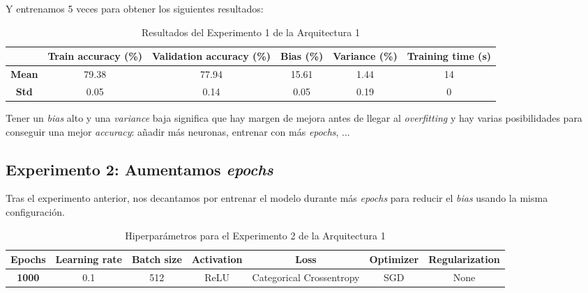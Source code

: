 \documentclass{article}
\begin{document}
			Y entrenamos 5 veces para obtener los siguientes resultados:
			\begin{table}[!h]
				\begin{center}
					\begin{tabular}{ c | c | c | c | c | c |}
						\ & \textbf{Train accuracy (\%)} & \textbf{Validation accuracy (\%)} & \textbf{Bias (\%)} & \textbf{Variance (\%)} & \textbf{Training time (s)} \\ \hline
						\textbf{Mean} & 79.38 & 77.94 & 15.61 & 1.44 & 14\\ \hline
						\textbf{Std} & 0.05 & 0.14 & 0.05 & 0.19 & 0 \\ \hline
					\end{tabular}
					\caption{Resultados del Experimento 1 de la Arquitectura 1}
					\label{tab:res-d-a1-e1}
				\end{center}
			\end{table}
		
			Tener un \textit{bias} alto y una \textit{variance} baja significa que hay margen de mejora antes de llegar al \textit{overfitting} y hay varias posibilidades para conseguir una mejor \textit{accuracy}: a\~nadir m\'as neuronas, entrenar con m\'as \textit{epochs}, ...
		
		\subsection{Experimento 2: Aumentamos \textit{epochs}}
		\label{d-s-a1-e2}
			Tras el experimento anterior, nos decantamos por entrenar el modelo durante m\'as \textit{epochs} para reducir el \textit{bias} usando la misma configuraci\'on.\\
			\begin{table}[!h]
				\begin{center}
					\begin{tabular}{| c | c | c | c | c | c | c |}
						\textbf{Epochs} & \textbf{Learning rate} & \textbf{Batch size} & \textbf{Activation} & \textbf{Loss} & \textbf{Optimizer} & \textbf{Regularization} \\ \hline
						\textbf{1000} & 0.1 & 512 & ReLU & Categorical Crossentropy & SGD & None
					\end{tabular}
					\caption{Hiperpar\'ametros para el Experimento 2 de la Arquitectura 1}
					\label{tab:hip-d-a1-e2}
				\end{center}
			\end{table}
			
\end{document}
